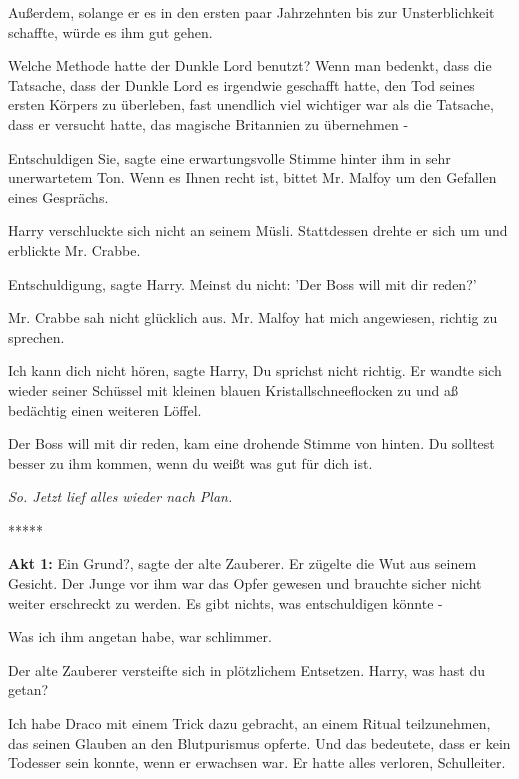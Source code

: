 Außerdem, solange er es in den ersten paar Jahrzehnten bis zur Unsterblichkeit
schaffte, würde es ihm gut gehen.

Welche Methode hatte der Dunkle Lord benutzt? Wenn man bedenkt, dass die
Tatsache, dass der Dunkle Lord es irgendwie geschafft hatte, den Tod seines
ersten Körpers zu überleben, fast unendlich viel wichtiger war als die Tatsache,
dass er versucht hatte, das magische Britannien zu übernehmen -

\glqq{}Entschuldigen Sie\grqq{}, sagte eine erwartungsvolle Stimme hinter ihm in
sehr unerwartetem Ton. \glqq{}Wenn es Ihnen recht ist, bittet Mr. Malfoy um den
Gefallen eines Gesprächs.\grqq{}

Harry verschluckte sich nicht an seinem Müsli. Stattdessen drehte er sich um und
erblickte Mr. Crabbe.

\glqq{}Entschuldigung\grqq{}, sagte Harry. \glqq{}Meinst du nicht: 'Der Boss
will mit dir reden?'\grqq{}

Mr. Crabbe sah nicht glücklich aus. \glqq{}Mr. Malfoy hat mich angewiesen,
richtig zu sprechen.\grqq{}

\glqq{}Ich kann dich nicht hören\grqq{}, sagte Harry, \glqq{}Du sprichst nicht
richtig.\grqq{} Er wandte sich wieder seiner Schüssel mit kleinen blauen
Kristallschneeflocken zu und aß bedächtig einen weiteren Löffel.

\glqq{}Der Boss will mit dir reden\grqq{}, kam eine drohende Stimme von hinten.
\glqq{}Du solltest besser zu ihm kommen, wenn du weißt was gut für dich
ist.\grqq{}

\emph{So. Jetzt lief alles wieder nach Plan.}

\begin{center}*****\end{center}

\textbf{Akt 1:}
\glqq{}Ein Grund?\grqq{}, sagte der alte Zauberer. Er zügelte die Wut aus seinem
Gesicht. Der Junge vor ihm war das Opfer gewesen und brauchte sicher nicht
weiter erschreckt zu werden. \glqq{}Es gibt nichts, was entschuldigen könnte
-\grqq{}

\glqq{}Was ich ihm angetan habe, war schlimmer.\grqq{}

Der alte Zauberer versteifte sich in plötzlichem Entsetzen. \glqq{}Harry, was
hast du getan?\grqq{}

\glqq{}Ich habe Draco mit einem Trick dazu gebracht, an einem Ritual
teilzunehmen, das seinen Glauben an den Blutpurismus opferte. Und das bedeutete,
dass er kein Todesser sein konnte, wenn er erwachsen war. Er hatte alles
verloren, Schulleiter.\grqq{}

